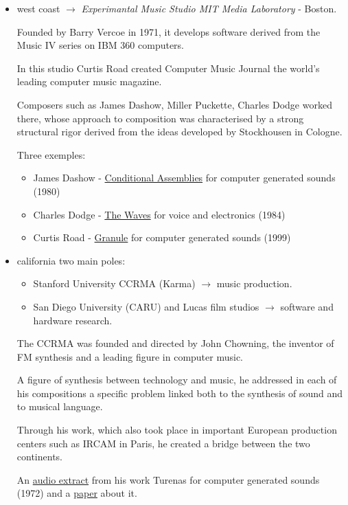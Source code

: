\begin{itemize}
\tightlist
\item west coast \(\rightarrow\) \textit{Experimantal Music Studio MIT Media
  Laboratory} - Boston.

  Founded by Barry Vercoe in 1971, it develops software derived from the Music IV series on IBM 360 computers.

  In this studio Curtis Road created Computer Music Journal the world's leading computer music magazine.

  Composers such as James Dashow, Miller Puckette, Charles Dodge worked there, whose approach to composition was characterised by a strong structural rigor derived from the ideas developed by Stockhousen in Cologne.

  Three exemples:

  \begin{itemize}
  \tightlist
  \item James Dashow - \href{http://www.musicaecodice.it/gitmedia/emc/4_media/dashow.mp3}{Conditional Assemblies} for computer generated sounds (1980)
  \item Charles Dodge - \href{http://www.musicaecodice.it/gitmedia/emc/4_media/dodge.mp3}{The Waves} for voice and electronics (1984)
  \item Curtis Road - \href{http://www.musicaecodice.it/gitmedia/emc/4_media/roads.mp3}{Granule} for computer generated sounds (1999)
  \end{itemize}
  
\item california two main poles:

  \begin{itemize}
  \tightlist
  \item Stanford University CCRMA (Karma) \(\rightarrow\) music production.
  \item San Diego University (CARU) and Lucas film studios \(\rightarrow\) software and hardware research.
  \end{itemize}

  The CCRMA was founded and directed by John Chowning, the inventor of FM synthesis and a leading figure in computer music.

  A figure of synthesis between technology and music, he addressed in each of his compositions a specific problem linked both to the synthesis of sound and to musical language.

  Through his work, which also took place in important European production centers such as IRCAM in Paris, he created a bridge between the two continents.

  An \href{http://www.musicaecodice.it/gitmedia/emc/4_media/turenas.mp3}{audio extract} from his work Turenas for computer generated sounds (1972) and a \href{http://www.musicaecodice.it/gitmedia/emc/4_media/turenas.pdf}{paper} about it.
\end{itemize}

